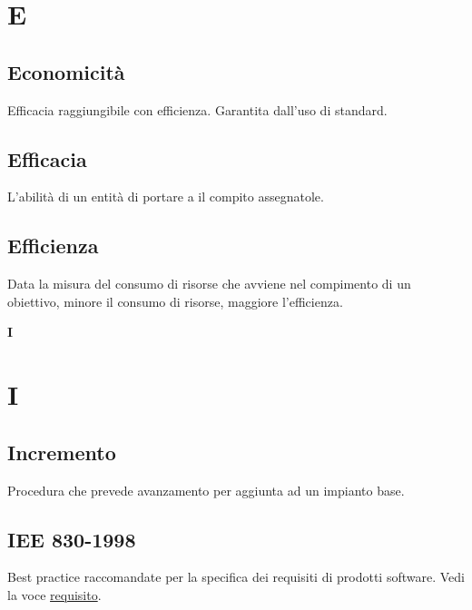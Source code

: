 	
	\section{E}

	\subsection{Economicità}
	\label{sec:economicita}
	Efficacia raggiungibile con efficienza. Garantita dall'uso di standard.
	
	\subsection{Efficacia}
	\label{sec:efficacia}
	L'abilità di un entità di portare a il compito assegnatole.
	
	\subsection{Efficienza}
	\label{sec:efficienza}
	Data la misura del consumo di risorse che avviene nel compimento di un obiettivo, minore il consumo di risorse, maggiore l'efficienza.\newpage

	{\Huge{\textbf{I}}} \\
	\section{I}

	\subsection{Incremento}
	\label{sec:incremento}
	Procedura che prevede avanzamento per aggiunta ad un impianto base.

	\subsection{IEE 830-1998}
	\label{sec:iee830}
	Best practice raccomandate per la specifica dei requisiti di prodotti software. Vedi la voce \hyperref[sec:requisito]{requisito}.
	\linebreak

